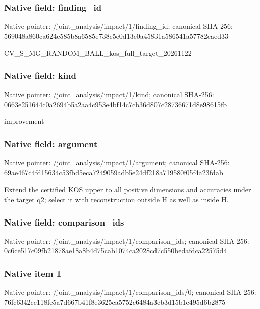 \documentclass[10pt,a4paper]{article}
\begin{document}
\subsubsection{Native field: finding\_id}


Native pointer: /joint\_analysis/impact/1/finding\_id; canonical SHA-256: 569048a860ca624e585b8a65\allowbreak{}85e738c5e0d13e0a45831a58\allowbreak{}6541a57782caed33


CV\_S\_MG\_RANDOM\_BALL\_kos\_\allowbreak{}full\_target\_20261122


\subsubsection{Native field: kind}


Native pointer: /joint\_analysis/impact/1/kind; canonical SHA-256: 0663e251644c0a2694b5a2aa\allowbreak{}4c953e4bf14c7cb36d807c28\allowbreak{}736671d8e98615fb


improvement


\subsubsection{Native field: argument}


Native pointer: /joint\_analysis/impact/1/argument; canonical SHA-256: 69ae467c4fd15634c53fbd5e\allowbreak{}ca7249059adb5e24df218a71\allowbreak{}9580f05f4a23fdab


Extend the certified KOS upper to all positive dimensions and accuracies under the target q2; select it with reconstruction outside H as well as inside H.


\subsubsection{Native field: comparison\_ids}


Native pointer: /joint\_analysis/impact/1/comparison\_ids; canonical SHA-256: 0c6ce517c09fb21878ae18a8\allowbreak{}b4d75cab1074ca2028cd7c55\allowbreak{}0bedafdca22575d4



\subsubsection{Native item 1}


Native pointer: /joint\_analysis/impact/1\allowbreak{}/comparison\_ids/0; canonical SHA-256: 76fc6342ce118fe5a7d667b4\allowbreak{}1f8e3625ca5752c6484a3cb3\allowbreak{}d15b1e495d6b2875
\end{document}
